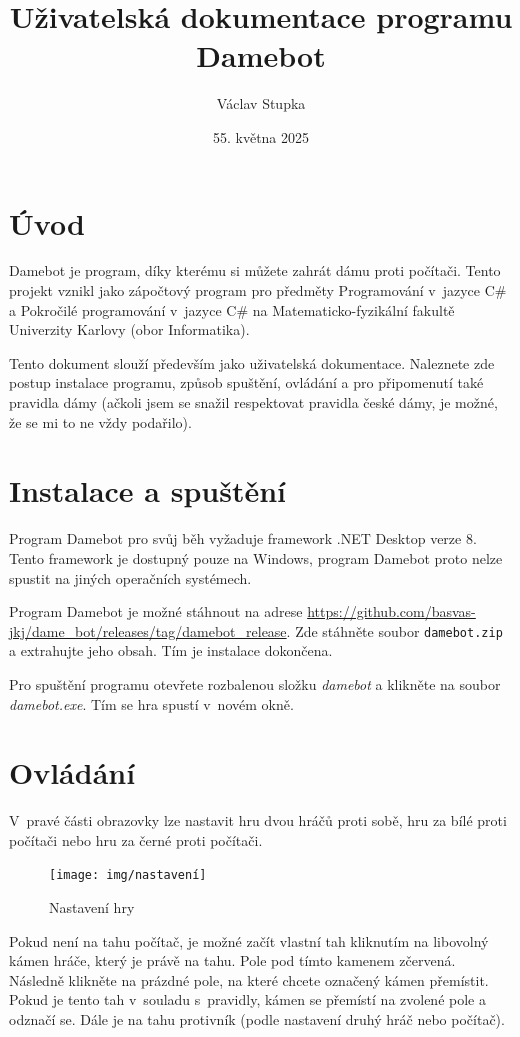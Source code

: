 \documentclass[a4paper,12pt]{article}
\title{Uživatelská dokumentace programu Damebot}
\author{Václav Stupka}
\date{55. května 2025}
\begin{document}
	\maketitle
	\tableofcontents
	
	\section{Úvod}
	Damebot je program, díky kterému si můžete zahrát dámu proti počítači. Tento projekt vznikl jako zápočtový program
	pro předměty Programování v~jazyce C\# a Pokročilé programování v~jazyce C\# na Matematicko-fyzikální fakultě Univerzity
	Karlovy (obor Informatika). 
	
	Tento dokument slouží především jako uživatelská dokumentace. Naleznete zde postup instalace programu, způsob spuštění,
	ovládání a pro při\-po\-me\-nu\-tí také pravidla dámy (ačkoli jsem se snažil respektovat pravidla české dámy, je možné, že se
	mi to ne vždy podařilo).
	
	\section{Instalace a spuštění}
	Program Damebot pro svůj běh vyžaduje framework .NET Desktop verze 8. Tento framework je dostupný pouze na Windows, program Damebot proto nelze spustit na jiných operačních systémech.
	
	Program Damebot je možné stáhnout na adrese
	\url{https://github.com/basvas-jkj/dame_bot/releases/tag/damebot_release}.
	Zde stáhněte soubor \texttt{damebot.zip}
	a extrahujte jeho obsah. Tím je instalace dokončena.
	
	Pro spuštění programu otevřete rozbalenou složku \textit{damebot} a klikněte na soubor \textit{damebot.exe}.
	Tím se hra spustí v~novém okně.
	
	\section{Ovládání}
	V~pravé části obrazovky lze nastavit hru dvou hráčů proti sobě, hru za bílé proti počítači nebo hru za černé proti počítači.
	
	
	\begin{figure}[h]
		\centering
		\texttt{[image: img/nastavení]}
		\caption{Nastavení hry}
	\end{figure}
	
	
	Pokud není na tahu počítač, je možné začít vlastní tah kliknutím na libovolný kámen hráče, který je právě na tahu.
	Pole pod tímto kamenem zčervená. Následně klikněte na prázdné pole, na které chcete označený kámen přemístit. Pokud je tento tah v~souladu s~pravidly, kámen se přemístí na zvolené pole a odznačí se. Dále je na tahu protivník (podle nastavení druhý hráč nebo počítač).
	
\end{document}
